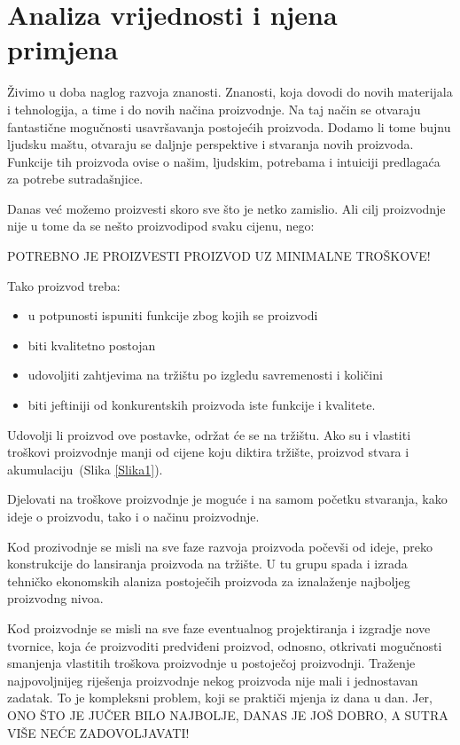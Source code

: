 \documentclass[a4paper,12pt]{article}
\numberwithin{figure}{section}
\begin{document}
\section*{Analiza vrijednosti i njena primjena}
Živimo u doba naglog razvoja znanosti. Znanosti, koja dovodi do novih materijala i tehnologija, a time i do novih načina proizvodnje. Na taj način se otvaraju fantastične mogučnosti usavršavanja postojećih proizvoda. Dodamo li tome bujnu ljudsku maštu, otvaraju se daljnje perspektive i stvaranja novih proizvoda. Funkcije tih proizvoda ovise o našim, ljudskim, potrebama i intuiciji predlagaća za potrebe sutradašnjice.\par
Danas već možemo proizvesti skoro sve što je netko zamislio. Ali cilj proizvodnje nije u tome da se nešto proizvodipod svaku cijenu, nego:
\begin{center}
POTREBNO JE PROIZVESTI PROIZVOD UZ MINIMALNE TROŠKOVE!
\end{center}
\noindent Tako proizvod treba:
\begin{itemize}
	\item u potpunosti ispuniti funkcije zbog kojih se proizvodi
	\item biti kvalitetno postojan
	\item udovoljiti zahtjevima na tržištu po izgledu savremenosti i količini
	\item biti jeftiniji od konkurentskih proizvoda iste funkcije i kvalitete.
\end{itemize}
\noindent Udovolji li proizvod ove postavke, održat će se na tržištu. Ako su i vlastiti troškovi proizvodnje manji od cijene koju diktira tržište, proizvod stvara i akumulaciju~(Slika \ref{Slika1}). \par
Djelovati na troškove proizvodnje je moguće i na samom početku stvaranja, kako ideje o proizvodu, tako i o načinu proizvodnje. \par
Kod prozivodnje se misli na sve faze razvoja proizvoda počevši od ideje, preko konstrukcije do lansiranja proizvoda na tržište. U tu grupu spada i izrada tehničko ekonomskih alaniza postoječih proizvoda za iznalaženje najboljeg proizvodng nivoa. \par
Kod proizvodnje se misli na sve faze eventualnog projektiranja i izgradje nove tvornice, koja će proizvoditi predviđeni proizvod, odnosno, otkrivati mogučnosti smanjenja vlastitih troškova proizvodnje u postoječoj proizvodnji. Traženje najpovoljnijeg riješenja proizvodnje nekog proizvoda nije mali i jednostavan zadatak. To je kompleksni problem, koji se praktiči mjenja iz dana u dan. Jer, ONO ŠTO JE JUČER BILO NAJBOLJE, DANAS JE JOŠ DOBRO, A SUTRA VIŠE NEĆE ZADOVOLJAVATI!
\end{document}
